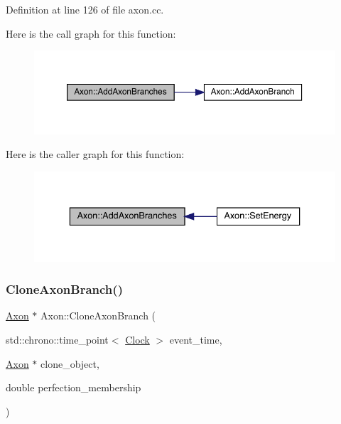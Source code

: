 Definition at line 126 of file axon.\+cc.

Here is the call graph for this function\+:\nopagebreak
\begin{figure}[H]
\begin{center}
\leavevmode
\includegraphics[width=350pt]{class_axon_a04969d98c3fbb671cba5daccacffc003_cgraph}
\end{center}
\end{figure}
Here is the caller graph for this function\+:\nopagebreak
\begin{figure}[H]
\begin{center}
\leavevmode
\includegraphics[width=336pt]{class_axon_a04969d98c3fbb671cba5daccacffc003_icgraph}
\end{center}
\end{figure}
\mbox{\label{class_axon_a7720ee66a75e87f4e308b82d1841443a}} 
\subsubsection{\texorpdfstring{Clone\+Axon\+Branch()}{CloneAxonBranch()}}
{\footnotesize\ttfamily \hyperlink{class_axon}{Axon} $\ast$ Axon\+::\+Clone\+Axon\+Branch (\begin{DoxyParamCaption}\item[{std\+::chrono\+::time\+\_\+point$<$ \hyperlink{universe_8h_a0ef8d951d1ca5ab3cfaf7ab4c7a6fd80}{Clock} $>$}]{event\+\_\+time,  }\item[{\hyperlink{class_axon}{Axon} $\ast$}]{clone\+\_\+object,  }\item[{double}]{perfection\+\_\+membership }\end{DoxyParamCaption})}



